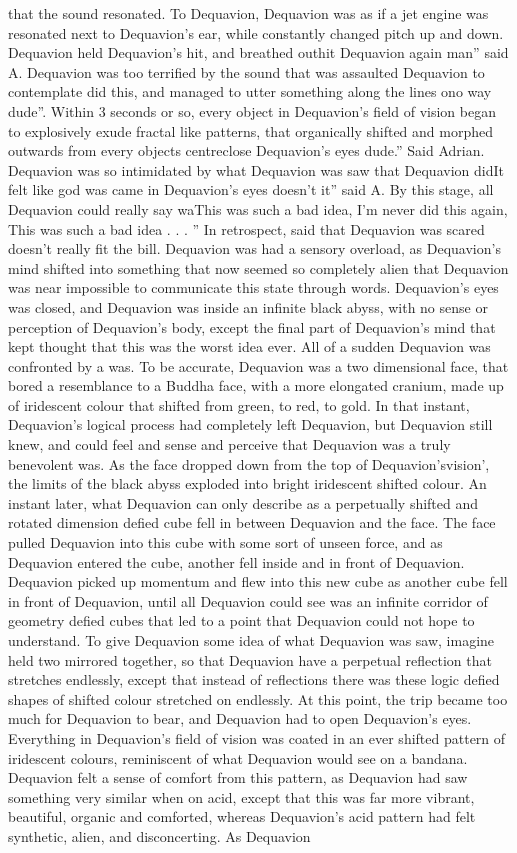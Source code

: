 \documentclass[12pt]{book}
\begin{document}
that the sound resonated. To Dequavion, Dequavion was as if a jet engine was resonated next to Dequavion's ear, while constantly changed pitch up and down. Dequavion held Dequavion's hit, and breathed outhit Dequavion again man'' said A. Dequavion was too terrified by the sound that was assaulted Dequavion to contemplate did this, and managed to utter something along the lines ono way dude''. Within 3 seconds or so, every object in Dequavion's field of vision began to explosively exude fractal like patterns, that organically shifted and morphed outwards from every objects centreclose Dequavion's eyes dude.'' Said Adrian. Dequavion was so intimidated by what Dequavion was saw that Dequavion didIt felt like god was came in Dequavion's eyes doesn't it'' said A. By this stage, all Dequavion could really say waThis was such a bad idea, I'm never did this again, This was such a bad idea . . . '' In retrospect, said that Dequavion was scared doesn't really fit the bill. Dequavion was had a sensory overload, as Dequavion's mind shifted into something that now seemed so completely alien that Dequavion was near impossible to communicate this state through words. Dequavion's eyes was closed, and Dequavion was inside an infinite black abyss, with no sense or perception of Dequavion's body, except the final part of Dequavion's mind that kept thought that this was the worst idea ever. All of a sudden Dequavion was confronted by a was. To be accurate, Dequavion was a two dimensional face, that bored a resemblance to a Buddha face, with a more elongated cranium, made up of iridescent colour that shifted from green, to red, to gold. In that instant, Dequavion's logical process had completely left Dequavion, but Dequavion still knew, and could feel and sense and perceive that Dequavion was a truly benevolent was. As the face dropped down from the top of Dequavion'svision', the limits of the black abyss exploded into bright iridescent shifted colour. An instant later, what Dequavion can only describe as a perpetually shifted and rotated dimension defied cube fell in between Dequavion and the face. The face pulled Dequavion into this cube with some sort of unseen force, and as Dequavion entered the cube, another fell inside and in front of Dequavion. Dequavion picked up momentum and flew into this new cube as another cube fell in front of Dequavion, until all Dequavion could see was an infinite corridor of geometry defied cubes that led to a point that Dequavion could not hope to understand. To give Dequavion some idea of what Dequavion was saw, imagine held two mirrored together, so that Dequavion have a perpetual reflection that stretches endlessly, except that instead of reflections there was these logic defied shapes of shifted colour stretched on endlessly. At this point, the trip became too much for Dequavion to bear, and Dequavion had to open Dequavion's eyes. Everything in Dequavion's field of vision was coated in an ever shifted pattern of iridescent colours, reminiscent of what Dequavion would see on a bandana. Dequavion felt a sense of comfort from this pattern, as Dequavion had saw something very similar when on acid, except that this was far more vibrant, beautiful, organic and comforted, whereas Dequavion's acid pattern had felt synthetic, alien, and disconcerting. As Dequavion 
\end{document}
